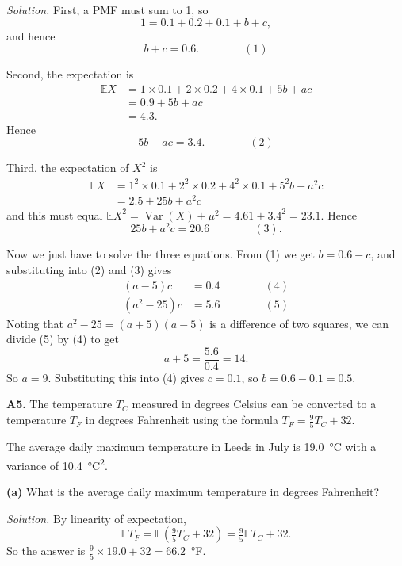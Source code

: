\documentclass[
  a4paper,
]{book}
\theoremstyle{definition}
\theoremstyle{definition}
\theoremstyle{definition}
\theoremstyle{definition}
\theoremstyle{remark}
\begin{document}
\begin{myanswers}
\emph{Solution.}
First, a PMF must sum to 1, so
\[ 1 = 0.1 + 0.2 + 0.1 + b + c , \]
and hence
\[ b + c = 0.6 . \qquad\qquad (1) \]

Second, the expectation is
\begin{align*}
\mathbb EX &= 1\times0.1 + 2 \times 0.2 + 4 \times 0.1 + 5b + ac \\
           &= 0.9 + 5b + ac \\
           &= 4.3 .
\end{align*}
Hence
\[ 5b + ac = 3.4 . \qquad\qquad (2) \]

Third, the expectation of \(X^2\) is
\begin{align*}
\mathbb EX &= 1^2\times0.1 + 2^2 \times 0.2 + 4^2 \times 0.1 + 5^2b + a^2c \\
           &= 2.5 + 25b + a^2c 
\end{align*}
and this must equal \(\mathbb EX^2 = \operatorname{Var}(X) + \mu^2 = 4.61 + 3.4^2 = 23.1\). Hence
\[ 25b + a^2 c = 20.6 \qquad\qquad (3) . \]

Now we just have to solve the three equations. From (1) we get \(b = 0.6 - c\), and substituting into (2) and (3) gives
\begin{align*}
(a-5)c &= 0.4 \qquad\qquad (4) \\
(a^2 - 25)c &= 5.6 \qquad\qquad(5)
\end{align*}
Noting that \(a^2 - 25 = (a+5)(a-5)\) is a difference of two squares, we can divide (5) by (4) to get
\[ a + 5 = \frac{5.6}{0.4} = 14. \]
So \(a = 9\). Substituting this into (4) gives \(c = 0.1\), so \(b = 0.6 - 0.1 = 0.5\).

\end{myanswers}

\textbf{A5.} The temperature \(T_C\) measured in degrees Celsius can be converted to a temperature \(T_F\) in degrees Fahrenheit using the formula \(T_F = \frac95 T_C + 32\).

The average daily maximum temperature in Leeds in July is 19.0~°C with a variance of 10.4~°C\textsuperscript{2}.

\textbf{(a)} What is the average daily maximum temperature in degrees Fahrenheit?

\begin{myanswers}
\emph{Solution.}
By linearity of expectation,
\[ \mathbb E T_F = \mathbb E\left(\tfrac95T_C + 32\right) = \tfrac95 \mathbb ET_C + 32 . \]
So the answer is \(\frac95 \times 19.0 + 32 = 66.2\)~°F.

\end{myanswers}
\end{document}

